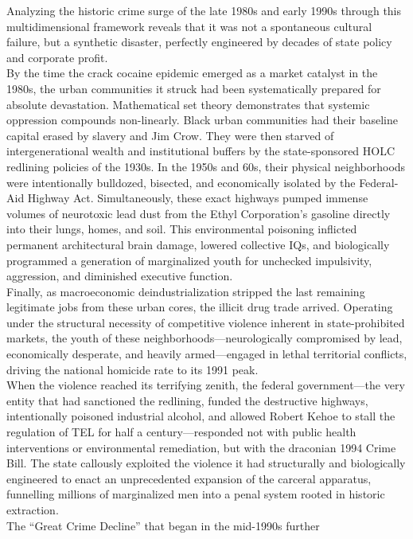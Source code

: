 \documentclass[
]{article}
\begin{document}
Analyzing the historic crime surge of the late 1980s and early 1990s
through this multidimensional framework reveals that it was not a
spontaneous cultural failure, but a synthetic disaster, perfectly
engineered by decades of state policy and corporate profit.\\
By the time the crack cocaine epidemic emerged as a market catalyst in
the 1980s, the urban communities it struck had been systematically
prepared for absolute devastation. Mathematical set theory demonstrates
that systemic oppression compounds non-linearly. Black urban communities
had their baseline capital erased by slavery and Jim Crow. They were
then starved of intergenerational wealth and institutional buffers by
the state-sponsored HOLC redlining policies of the 1930s. In the 1950s
and 60s, their physical neighborhoods were intentionally bulldozed,
bisected, and economically isolated by the Federal-Aid Highway Act.
Simultaneously, these exact highways pumped immense volumes of
neurotoxic lead dust from the Ethyl Corporation's gasoline directly into
their lungs, homes, and soil. This environmental poisoning inflicted
permanent architectural brain damage, lowered collective IQs, and
biologically programmed a generation of marginalized youth for unchecked
impulsivity, aggression, and diminished executive function.\\
Finally, as macroeconomic deindustrialization stripped the last
remaining legitimate jobs from these urban cores, the illicit drug trade
arrived. Operating under the structural necessity of competitive
violence inherent in state-prohibited markets, the youth of these
neighborhoods---neurologically compromised by lead, economically
desperate, and heavily armed---engaged in lethal territorial conflicts,
driving the national homicide rate to its 1991 peak.\\
When the violence reached its terrifying zenith, the federal
government---the very entity that had sanctioned the redlining, funded
the destructive highways, intentionally poisoned industrial alcohol, and
allowed Robert Kehoe to stall the regulation of TEL for half a
century---responded not with public health interventions or
environmental remediation, but with the draconian 1994 Crime Bill. The
state callously exploited the violence it had structurally and
biologically engineered to enact an unprecedented expansion of the
carceral apparatus, funnelling millions of marginalized men into a penal
system rooted in historic extraction.\\
The ``Great Crime Decline'' that began in the mid-1990s further
\end{document}
